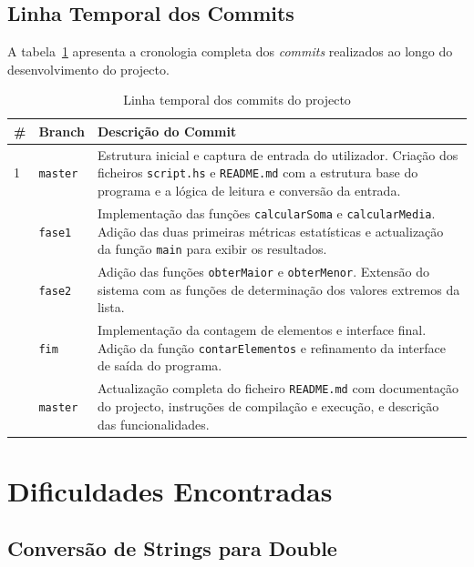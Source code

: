 \documentclass[12pt, a4paper, oneside]{report}
\begin{document}
\section{Linha Temporal dos Commits}

A tabela~\ref{tab:commits} apresenta a cronologia completa dos \textit{commits} realizados ao longo do desenvolvimento do projecto.

\begin{table}[H]
\centering
\caption{Linha temporal dos commits do projecto}
\label{tab:commits}
\begin{tabular}{p{1.2cm} p{2.2cm} p{8.8cm}}
\toprule
\bfseries \# & \bfseries Branch & \bfseries Descrição do Commit \\
\midrule
1 & \texttt{master} & Estrutura inicial e captura de entrada do utilizador. Criação dos ficheiros \texttt{script.hs} e \texttt{README.md} com a estrutura base do programa e a lógica de leitura e conversão da entrada. \\
\addlinespace
2 & \texttt{fase1} & Implementação das funções \texttt{calcularSoma} e \texttt{calcularMedia}. Adição das duas primeiras métricas estatísticas e actualização da função \texttt{main} para exibir os resultados. \\
\addlinespace
3 & \texttt{fase2} & Adição das funções \texttt{obterMaior} e \texttt{obterMenor}. Extensão do sistema com as funções de determinação dos valores extremos da lista. \\
\addlinespace
4 & \texttt{fim} & Implementação da contagem de elementos e interface final. Adição da função \texttt{contarElementos} e refinamento da interface de saída do programa. \\
\addlinespace
5 & \texttt{master} & Actualização completa do ficheiro \texttt{README.md} com documentação do projecto, instruções de compilação e execução, e descrição das funcionalidades. \\
\bottomrule
\end{tabular}
\end{table}

\chapter{Dificuldades Encontradas}

\section{Conversão de Strings para Double}
\end{document}
